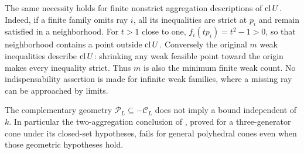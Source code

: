 \begin{example}
The same necessity holds for finite nonstrict aggregation descriptions
of $\operatorname{cl} U$. Indeed, if a finite family omits ray $i$, all its
inequalities are strict at $p_i$ and remain satisfied in a neighborhood.
For $t>1$ close to one, $f_i(tp_i)=t^2-1>0$, so that neighborhood
contains a point outside $\operatorname{cl} U$. Conversely the original $m$ weak
inequalities describe $\operatorname{cl} U$: shrinking any weak feasible point
toward the origin makes every inequality strict. Thus $m$ is also the
minimum finite weak count. No indispensability assertion is made for
infinite weak families, where a missing ray can be approached by limits.
\end{example}

The complementary geometry $\mathcal P_L\subseteq-\mathcal C_L$ does
not imply a bound independent of $k$. In particular the two-aggregation
conclusion of \citet[Proposition~8.10]{BDpreprint}, proved for a
three-generator cone under its closed-set hypotheses, fails for general
polyhedral cones even when those geometric hypotheses hold.

